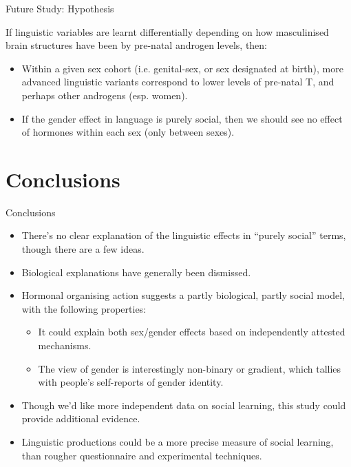 \documentclass[hyperref={pdfpagelabels=false}]{beamer}
\begin{document}
\begin{frame}{Future Study: Hypothesis}

\begin{center}
\item If linguistic variables are learnt differentially depending on how masculinised brain structures have been by pre-natal androgen levels, then:
\end{center} 
\begin{itemize}
	\item Within a given sex cohort (i.e. genital-sex, or sex designated at birth), more advanced linguistic variants correspond to lower levels of pre-natal T, and perhaps other androgens (esp. women).
	\item If the gender effect in language is purely social, then we should see no effect of hormones within each sex (only between sexes).
\end{itemize}
\end{frame}





\section{Conclusions}


\begin{frame}{Conclusions}
		\begin{itemize}
			\item There's no clear explanation of the linguistic effects in ``purely social'' terms, though there are a few ideas.
			\item Biological explanations have generally been dismissed.
			\item Hormonal organising action suggests a partly biological, partly social model, with the following properties:
		\begin{itemize}
			\item It could explain both sex/gender effects based on independently attested mechanisms.
			\item The view of gender is interestingly non-binary or gradient, which tallies with people's self-reports of gender identity.
			\end{itemize}
			\item Though we'd like more independent data on social learning, this study could provide additional evidence.
			\item Linguistic productions could be a more precise measure of social learning, than rougher questionnaire and experimental techniques.
		
	\end{itemize}
\end{frame}
\end{document}
